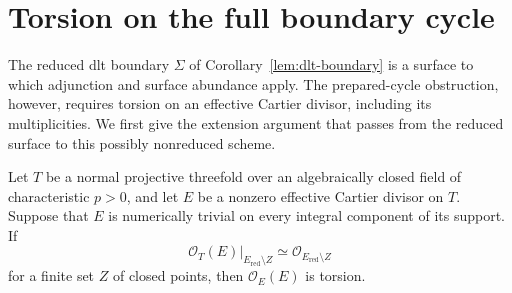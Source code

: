 \section{Torsion on the full boundary cycle}\label{sec:torsion}

The reduced dlt boundary $\Sigma$ of Corollary~\ref{lem:dlt-boundary}
is a surface to which adjunction and surface abundance apply.  The
prepared-cycle obstruction, however, requires torsion on an effective
Cartier divisor, including its multiplicities.  We first give the
extension argument that passes from the reduced surface to this
possibly nonreduced scheme.

\begin{lemma}\label{lem:torsion}
Let $T$ be a normal projective threefold over an algebraically closed
field of characteristic $p>0$, and let $E$ be a nonzero effective Cartier
divisor on $T$.  Suppose that $E$ is numerically trivial on every
integral component of its support.  If
\[
 \mathcal O_T(E)|_{E_{\mathrm{red}}\setminus Z}
       \simeq\mathcal O_{E_{\mathrm{red}}\setminus Z}
\]
for a finite set $Z$ of closed points, then $\mathcal O_E(E)$ is torsion.
\end{lemma}

